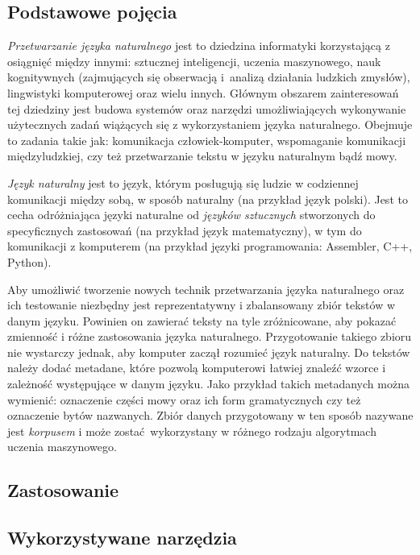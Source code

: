 \documentclass[a4paper, twoside, 12pt]{report}
\begin{document}
        \subsection{Podstawowe pojęcia}
            \emph{Przetwarzanie języka naturalnego} jest to dziedzina informatyki korzystającą z osiągnięć
            między innymi: sztucznej inteligencji, uczenia maszynowego, nauk kognitywnych
            (zajmujących się obserwacją i~analizą działania ludzkich zmysłów), lingwistyki komputerowej oraz
            wielu innych. Głównym obszarem zainteresowań tej dziedziny jest budowa systemów oraz narzędzi
            umożliwiających wykonywanie użytecznych zadań wiążących się z wykorzystaniem języka naturalnego.
            Obejmuje to zadania takie jak: komunikacja człowiek-komputer, wspomaganie komunikacji międzyludzkiej,
            czy też przetwarzanie tekstu w języku naturalnym bądź mowy\cite{SPEECHANDLANGUAGEPROCESSING}.

            \emph{Język naturalny} jest to język,
            którym posługują się ludzie w codziennej komunikacji między sobą, w sposób naturalny (na przykład
            język polski). Jest to cecha odróżniająca języki naturalne od \emph{języków sztucznych} stworzonych
            do specyficznych zastosowań (na przykład język matematyczny), w tym do komunikacji z komputerem
            (na przykład języki programowania: Assembler, C++, Python).

            Aby umożliwić tworzenie nowych technik
            przetwarzania języka naturalnego oraz ich testowanie niezbędny jest reprezentatywny i zbalansowany
            zbiór tekstów w danym języku. Powinien on zawierać teksty na tyle zróżnicowane, aby pokazać zmienność
            i różne zastosowania języka naturalnego. Przygotowanie takiego zbioru nie wystarczy jednak, aby
            komputer zaczął rozumieć język naturalny. Do tekstów należy dodać metadane, które pozwolą komputerowi
            łatwiej znaleźć wzorce i zależność występujące w danym języku. Jako przykład takich metadanych można
            wymienić: oznaczenie części mowy oraz ich form gramatycznych czy też oznaczenie bytów nazwanych.
            Zbiór danych przygotowany w ten sposób nazywane jest \emph{korpusem}\cite{NATURALLANGUGEANNOTATION}
            i może zostać wykorzystany w różnego rodzaju algorytmach uczenia maszynowego.
        \subsection {Zastosowanie}
        \subsection{Wykorzystywane narzędzia}
\end{document}
